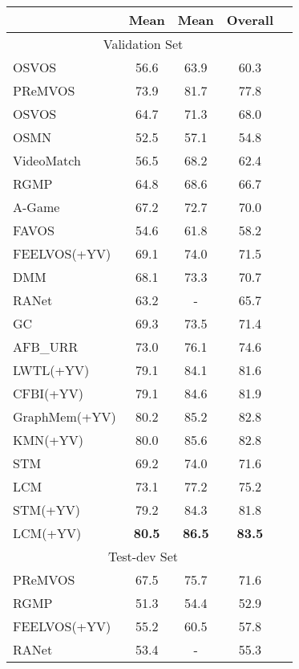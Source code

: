 \documentclass[final]{cvpr}
\begin{document}
\begin{table}
	\centering
	\begin{center}
\begin{tabular}{lcccc} 

\hline
  &  Mean &  Mean & Overall \\
\hline
 \multicolumn{4}{c}{Validation Set} \\
\hline
OSVOS\cite{osvos}  & 56.6 &  63.9 &  60.3 \\
PReMVOS\cite{premvos}  & 73.9 & 81.7 & 77.8 \\
OSVOS\cite{osvos_s}  &  64.7 &  71.3 &  68.0 \\
OSMN\cite{osmn}   & 52.5 &  57.1 & 54.8   \\
VideoMatch\cite{videomatch}   & 56.5  &  68.2 & 62.4   \\

RGMP\cite{rgmp}   & 64.8 & 68.6 &  66.7 \\
A-Game\cite{agame}  &  67.2 & 72.7 & 70.0 \\
FAVOS\cite{favos}  &  54.6 &  61.8 &  58.2 \\
FEELVOS\cite{feelvos}(+YV)     & 69.1 &  74.0 &  71.5 \\
DMM\cite{dmmnet}     &  68.1 &  73.3 &  70.7 \\
RANet\cite{ranet}      &  63.2 &  - &  65.7 \\ 

GC\cite{GC}  & 69.3 & 73.5 & 71.4 \\
AFB\_URR\cite{AFB_URR}  & 73.0 & 76.1 &  74.6 \\
LWTL\cite{LWTL}(+YV)   &  79.1  & 84.1 & 81.6 \\
CFBI\cite{cfbi}(+YV)   &  79.1 &  84.6 &  81.9 \\

GraphMem\cite{GraphMem}(+YV)  & 80.2 & 85.2 & 82.8 \\
KMN\cite{KMN}(+YV)    &  80.0 & 85.6 &  82.8 \\

\hline
STM\cite{STM}    & 69.2  &  74.0  &  71.6   \\
LCM       & 73.1  &  77.2  & 75.2 \\
\hline
STM\cite{STM}(+YV)   & 79.2 & 84.3 &  81.8 \\ 
LCM(+YV)      & \textbf{80.5} &  \textbf{86.5} &  \textbf{83.5} \\
\hline
 \multicolumn{4}{c}{Test-dev Set} \\
\hline
PReMVOS\cite{premvos}  & 67.5 & 75.7 & 71.6 \\
RGMP\cite{rgmp}   & 51.3 & 54.4 & 52.9 \\
FEELVOS\cite{feelvos}(+YV)   &  55.2 & 60.5 &  57.8 \\
RANet\cite{ranet}      &  53.4  & -    & 55.3 \\


\end{tabular}
\end{center}
\end{table}
\end{document}
